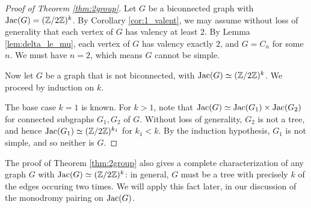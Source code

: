 \documentclass{amsart}
\begin{document}
\begin{proof}[Proof of Theorem \ref{thm:2group}]
  Let $G$ be a biconnected graph with $\operatorname{Jac}(G) = (\mathbb{Z}/2\mathbb{Z})^k$. By
  Corollary \ref{cor:1_valent}, we may assume without loss of
  generality that each vertex of $G$ has valency at least $2$. By
  Lemma \ref{lem:delta_le_mu}, each vertex of $G$ has valency exactly
  $2$, and $G = C_n$ for some $n$. We must have $n=2$, which means $G$
  cannot be simple.

  Now let $G$ be a graph that is not biconnected, with $\operatorname{Jac}(G) \simeq
  (\mathbb{Z}/2\mathbb{Z})^k$. We proceed by induction on $k$.
  
  The base case $k=1$ is known. For $k > 1$, note that $\operatorname{Jac}(G) \simeq
  \operatorname{Jac}(G_1) \times \operatorname{Jac}(G_2)$ for connected subgraphs $G_1, G_2$ of
  $G$. Without loss of generality, $G_2$ is not a tree, and
  hence $\operatorname{Jac}(G_1) \simeq (\mathbb{Z}/2\mathbb{Z})^{k_1}$ for $k_1 < k$. By the
  induction hypothesis, $G_1$ is not simple, and so neither is $G$.
\end{proof}

\begin{remark}
  The proof of Theorem \ref{thm:2group} also gives a complete
  characterization of any graph $G$ with $\operatorname{Jac}(G) \simeq
  (\mathbb{Z}/2\mathbb{Z})^k$: in general, $G$ must be a tree with precisely $k$ of
  the edges occuring two times. We will apply this fact later, in our
  discussion of the monodromy pairing on $\operatorname{Jac}(G)$.
\end{remark}

\begin{center}
\end{center}
\end{document}
